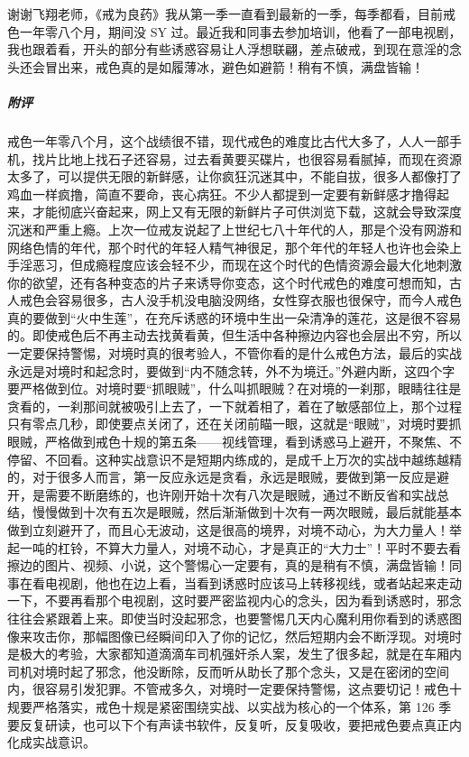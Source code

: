 \begin{case}
    谢谢飞翔老师，《戒为良药》我从第一季一直看到最新的一季，每季都看，目前戒色一年零八个月，期间没 SY 过。最近我和同事去参加培训，他看了一部电视剧，我也跟着看，开头的部分有些诱惑容易让人浮想联翩，差点破戒，到现在意淫的念头还会冒出来，戒色真的是如履薄冰，避色如避箭！稍有不慎，满盘皆输！
    \subparagraph{附评} 戒色一年零八个月，这个战绩很不错，现代戒色的难度比古代大多了，人人一部手机，找片比地上找石子还容易，过去看黄要买碟片，也很容易看腻掉，而现在资源太多了，可以提供无限的新鲜感，让你疯狂沉迷其中，不能自拔，很多人都像打了鸡血一样疯撸，简直不要命，丧心病狂。不少人都提到一定要有新鲜感才撸得起来，才能彻底兴奋起来，网上又有无限的新鲜片子可供浏览下载，这就会导致深度沉迷和严重上瘾。上次一位戒友说起了上世纪七八十年代的人，那是个没有网游和网络色情的年代，那个时代的年轻人精气神很足，那个年代的年轻人也许也会染上手淫恶习，但成瘾程度应该会轻不少，而现在这个时代的色情资源会最大化地刺激你的欲望，还有各种变态的片子来诱导你变态，这个时代戒色的难度可想而知，古人戒色会容易很多，古人没手机没电脑没网络，女性穿衣服也很保守，而今人戒色真的要做到“火中生莲”，在充斥诱惑的环境中生出一朵清净的莲花，这是很不容易的。即使戒色后不再主动去找黄看黄，但生活中各种擦边内容也会层出不穷，所以一定要保持警惕，对境时真的很考验人，不管你看的是什么戒色方法，最后的实战永远是对境时和起念时，要做到“内不随念转，外不为境迁。”外避内断，这四个字要严格做到位。对境时要“抓眼贼”，什么叫抓眼贼？在对境的一刹那，眼睛往往是贪看的，一刹那间就被吸引上去了，一下就着相了，着在了敏感部位上，那个过程只有零点几秒，即使要点关闭了，还在关闭前瞄一眼，这就是“眼贼”，对境时要抓眼贼，严格做到戒色十规的第五条——视线管理，看到诱惑马上避开，不聚焦、不停留、不回看。这种实战意识不是短期内练成的，是成千上万次的实战中越练越精的，对于很多人而言，第一反应永远是贪看，永远是眼贼，要做到第一反应是避开，是需要不断磨练的，也许刚开始十次有八次是眼贼，通过不断反省和实战总结，慢慢做到十次有五次是眼贼，然后渐渐做到十次有一两次眼贼，最后就能基本做到立刻避开了，而且心无波动，这是很高的境界，对境不动心，为大力量人！举起一吨的杠铃，不算大力量人，对境不动心，才是真正的“大力士”！平时不要去看擦边的图片、视频、小说，这个警惕心一定要有，真的是稍有不慎，满盘皆输！同事在看电视剧，他也在边上看，当看到诱惑时应该马上转移视线，或者站起来走动一下，不要再看那个电视剧，这时要严密监视内心的念头，因为看到诱惑时，邪念往往会紧跟着上来。即使当时没起邪念，也要警惕几天内心魔利用你看到的诱惑图像来攻击你，那幅图像已经瞬间印入了你的记忆，然后短期内会不断浮现。对境时是极大的考验，大家都知道滴滴车司机强奸杀人案，发生了很多起，就是在车厢内司机对境时起了邪念，他没断除，反而听从助长了那个念头，又是在密闭的空间内，很容易引发犯罪。不管戒多久，对境时一定要保持警惕，这点要切记！戒色十规要严格落实，戒色十规是紧密围绕实战、以实战为核心的一个体系，第 126 季要反复研读，也可以下个有声读书软件，反复听，反复吸收，要把戒色要点真正内化成实战意识。
\end{case}

